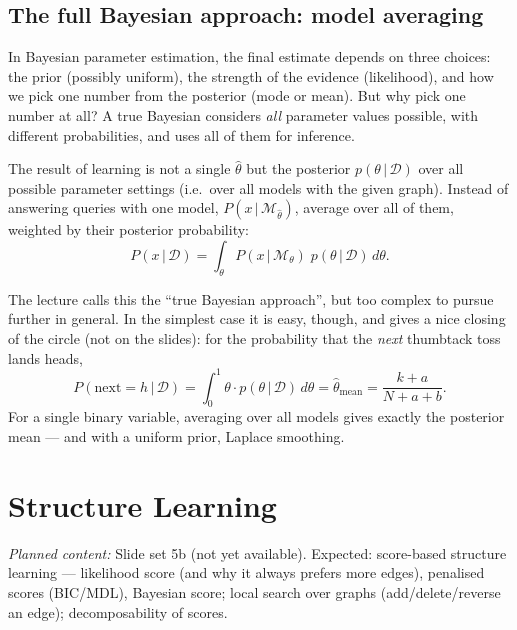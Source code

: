 \documentclass[11pt, oneside]{book}
\newcommand{\Prob}{\mathbb{P}}           %
\newcommand{\dataset}{\mathcal{D}}       %
\newcommand{\given}{\,\vert\,}           %
\newcommand{\planned}[1]{%
  \par{\small\color{gray!70!black}\textit{Planned content:} #1}\par}
\let\originalsection\section
\renewcommand{\section}{\Needspace{7\baselineskip}\originalsection}
\let\originalsubsection\subsection
\renewcommand{\subsection}{\Needspace{6\baselineskip}\originalsubsection}
\begin{document}
\subsection{The full Bayesian approach: model averaging}

In Bayesian parameter estimation, the final estimate depends on three choices:
the prior (possibly uniform), the strength of the evidence (likelihood), and
how we pick one number from the posterior (mode or mean). But why pick one
number at all? A true Bayesian considers \emph{all} parameter values possible,
with different probabilities, and uses all of them for inference.

\begin{thmbox}[title={Bayesian model averaging}, unbreakable]
The result of learning is not a single $\hat\theta$ but the posterior
$p(\theta \given \dataset)$ over all possible parameter settings (i.e.\ over all
models with the given graph). Instead of answering queries with one model,
$P(x \given \mathcal{M}_{\hat\theta})$, average over all of them, weighted by
their posterior probability:
\[
P(x \given \dataset) = \int_\theta P(x \given \mathcal{M}_\theta)\; p(\theta \given \dataset)\, d\theta .
\]
\end{thmbox}

The lecture calls this the ``true Bayesian approach'', but too complex to
pursue further in general. In the simplest case it is easy, though, and gives
a nice closing of the circle (not on the slides): for the probability that the
\emph{next} thumbtack toss lands heads,
\[
P(\text{next} = h \given \dataset) = \int_0^1 \theta \cdot p(\theta \given \dataset)\, d\theta = \hat\theta_{\text{mean}} = \frac{k + a}{N + a + b}.
\]
For a single binary variable, averaging over all models gives exactly the
posterior mean --- and with a uniform prior, Laplace smoothing.

\section{Structure Learning}
\label{sec:structure-learning}
\planned{Slide set 5b (not yet available). Expected: score-based structure
learning --- likelihood score (and why it always prefers more edges),
penalised scores (BIC/MDL), Bayesian score; local search over graphs
(add/delete/reverse an edge); decomposability of scores.}

\end{document}
